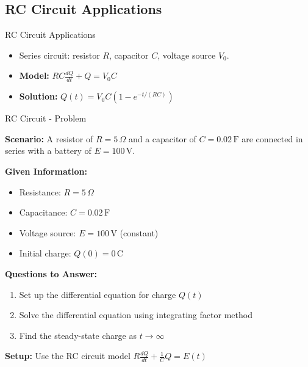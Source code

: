 \documentclass[10pt,aspectratio=169]{beamer}
\begin{document}
\subsection{RC Circuit Applications}
\begin{frame}{RC Circuit Applications}
    \begin{itemize}
        \item Series circuit: resistor $R$, capacitor $C$, voltage source $V_0$.
        \item \textbf{Model:} $RC\frac{dQ}{dt} + Q = V_0C$
        \item \textbf{Solution:} $Q(t) = V_0C(1 - e^{-t/(RC)})$
    \end{itemize}
\end{frame}

\begin{frame}{RC Circuit - Problem}
    \begin{problembox}
        \textbf{Scenario:} A resistor of $R=5\,\Omega$ and a capacitor of $C=0.02\,\mathrm{F}$ are connected in series with a battery of $E=100\,\mathrm{V}$.
        
        \textbf{Given Information:}
        \begin{itemize}
            \item Resistance: $R = 5\,\Omega$
            \item Capacitance: $C = 0.02\,\mathrm{F}$
            \item Voltage source: $E = 100\,\mathrm{V}$ (constant)
            \item Initial charge: $Q(0) = 0\,\mathrm{C}$
        \end{itemize}
        
        \textbf{Questions to Answer:}
        \begin{enumerate}
            \item Set up the differential equation for charge $Q(t)$
            \item Solve the differential equation using integrating factor method
            \item Find the steady-state charge as $t \to \infty$
        \end{enumerate}
        
        \textbf{Setup:} Use the RC circuit model $R\frac{dQ}{dt} + \frac{1}{C}Q = E(t)$
    \end{problembox}
\end{frame}
\end{document}
